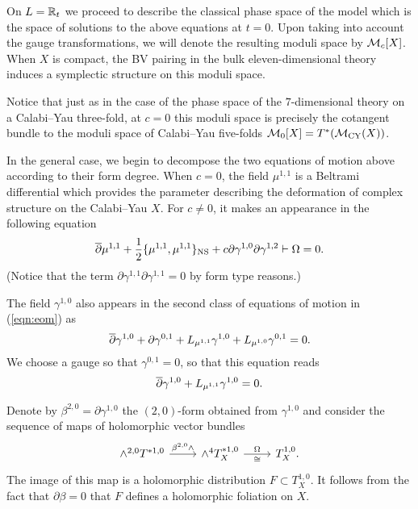 \documentclass[11pt]{amsart}
\begin{document}
On $L = \mathbb R_t$ we proceed to describe the classical phase space of the model which is the space of solutions to the above equations at $t = 0$.
Upon taking into account the gauge transformations, we will denote the resulting moduli space by $\mathcal M_c[X]$.
When $X$ is compact, the BV pairing in the bulk eleven-dimensional theory induces a symplectic structure on this moduli space.

Notice that just as in the case of the phase space of the $7$-dimensional theory on a Calabi--Yau three-fold, at $c=0$ this moduli space is precisely the cotangent bundle to the moduli space of Calabi--Yau five-folds $\mathcal M_0 [X] = T^*(\mathcal M_{\rm CY}(X))$.

In the general case, we begin to decompose the two equations of motion above according to their form degree.
When $c = 0$, the field $\mu^{1,1}$ is a Beltrami differential which provides the parameter describing the deformation of complex structure on the Calabi--Yau $X$.
For $c \ne 0$, it makes an appearance in the following equation
\begin{equation}\label{eqn:mu11}
  \overline{\partial} \mu^{1,1} + \frac12 \{\mu^{1,1}, \mu^{1,1}\}_{\rm NS} + c \partial \gamma^{1,0} \partial \gamma^{1,2} \vdash \Omega = 0 .
\end{equation}
(Notice that the term $\partial \gamma^{1,1} \partial \gamma^{1,1} = 0$ by form type reasons.)

The field $\gamma^{1,0}$ also appears in the second class of equations of motion in (\ref{eqn:eom}) as
\[
  \overline{\partial} \gamma^{1,0} + \partial \gamma^{0,1} + L_{\mu^{1,1}} \gamma^{1,0} + L_{\mu^{1,0}} \gamma^{0,1} = 0 .
\]
We choose a gauge so that $\gamma^{0,1} = 0$,  so that this equation reads
\begin{equation}\label{eqn:gamma10}
  \overline{\partial} \gamma^{1,0} + L_{\mu^{1,1}} \gamma^{1,0} = 0 .
\end{equation}

Denote by $\beta^{2,0} = \partial \gamma^{1,0}$ the $(2,0)$-form obtained from $\gamma^{1,0}$ and consider the sequence of maps of holomorphic vector bundles
\[
  \begin{tikzcd}
    \wedge^{2,0} T^{*1,0} \ar[r, "\beta^{2,0} \wedge"] & \wedge^4 T_X^{*1,0} \ar[r, "\Omega", "\cong"'] & T^{1,0}_X .
  \end{tikzcd}
\]
The image of this map is a holomorphic distribution $F \subset T_X^{1,0}$.
It follows from the fact that $\partial \beta = 0$ that $F$ defines a holomorphic foliation on $X$.
\end{document}
